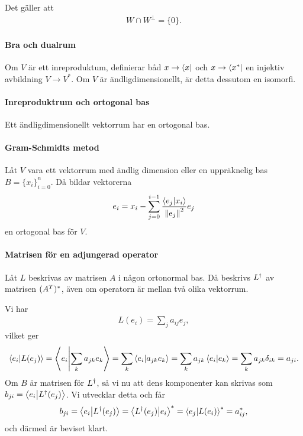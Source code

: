 \proof
Det gäller att
\begin{align*}
	W \cap W^{\perp} = \{0\}.
\end{align*}

\paragraph{Bra och dualrum}
Om $V$ är ett inreproduktum, definierar båd $x\to\bra{x}$ och $x\to\bra{x^{*}}$ en injektiv avbildning $V\to V^{*}$. Om $V$ är ändligdimensionellt, är detta dessutom en isomorfi.

\proof

\paragraph{Inreproduktrum och ortogonal bas}
Ett ändligdimensionellt vektorrum har en ortogonal bas.

\proof

\paragraph{Gram-Schmidts metod}
Låt $V$ vara ett vektorrum med ändlig dimension eller en uppräknelig bas $B = \{x_{i}\}_{i= 0}^{n}$. Då bildar vektorerna
\begin{align*}
	e_{i} = x_{i} - \sum\limits_{j = 0}^{i - 1}\frac{\bra{e_{j}}\ket{x_{i}}}{\norm{e_{j}}^{2}}e_{j}
\end{align*}
en ortogonal bas för $V$.

\proof

\paragraph{Matrisen för en adjungerad operator}
Låt $L$ beskrivas av matrisen $A$ i någon ortonormal bas. Då beskrivs $L^{\dagger}$ av matrisen $(A^{T})^{*}$, även om operatorn är mellan två olika vektorrum.

\proof
Vi har
\begin{align*}
	L(e_{i}) = \sum\limits_{j}a_{ij}e_{j},
\end{align*}
vilket ger
\begin{align*}
	\bra{e_{i}}\ket{L(e_{j})} = \bra{e_{i}}\ket{\sum\limits_{k}a_{jk}e_{k}} = \sum\limits_{k}\bra{e_{i}}\ket{a_{jk}e_{k}} = \sum\limits_{k}a_{jk}\bra{e_{i}}\ket{e_{k}} = \sum\limits_{k}a_{jk}\delta_{ik} = a_{ji}.
\end{align*}
Om $B$ är matrisen för $L^{\dagger}$, så vi nu att dens komponenter kan skrivas som $b_{ji} = \bra{e_{i}}\ket{L^{\dagger}(e_{j})}$. Vi utvecklar detta och får
\begin{align*}
	b_{ji} = \bra{e_{i}}\ket{L^{\dagger}(e_{j})} = \bra{L^{\dagger}(e_{j})}\ket{e_{i}}^{*} = \bra{e_{j}}\ket{L(e_{i})}^{*} = a_{ij}^{*},
\end{align*}
och därmed är beviset klart.

